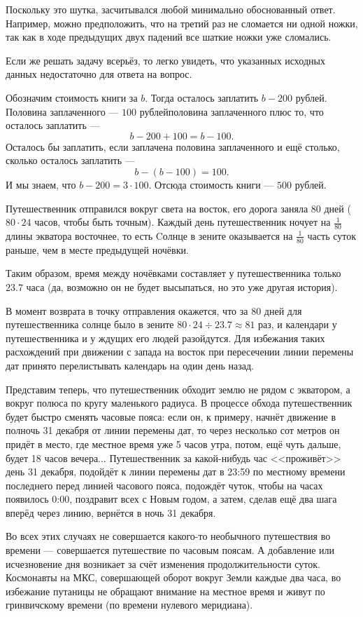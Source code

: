 \begin{itemize}

\itA Поскольку это шутка, засчитывался любой минимально обоснованный ответ. 
Например, можно предположить, что на третий раз не сломается ни одной ножки, 
так как в ходе предыдущих двух падений все шаткие ножки уже сломались. 

Если же решать задачу всерьёз, то легко увидеть, что указанных исходных данных
недостаточно для ответа на вопрос. 

\itB Обозначим стоимость книги за $b$. Тогда осталось заплатить $b - 200$ рублей.
Половина заплаченного --- $100$ рублей\scolon половина заплаченного плюс то, что
осталось заплатить ---
	$$b - 200 + 100 = b - 100.$$
Осталось бы заплатить, если заплачена половина 
заплаченного и ещё столько, сколько
осталось заплатить ---
	$$b - (b - 100) = 100.$$
И мы знаем, что $b - 200 = 3 \cdot 100$. Отсюда стоимость книги --- $500$ рублей.

\itC Путешественник отправился вокруг света на восток, его дорога 
заняла $80$ дней ($80 \cdot 24$ часов, чтобы быть точным). 
Каждый день путешественник ночует на $\frac{1}{80}$ длины 
экватора восточнее, то есть Cолнце в зените оказывается на $\frac{1}{80}$ часть
суток раньше, чем в месте предыдущей ночёвки.

Таким образом, время между 
ночёвками составляет у путешественника только $23.7$ часа (да, возможно он не будет 
высыпаться, но это уже другая история). 

В момент возврата в точку отправления окажется, что за $80$ дней для путешественника
солнце было в зените $80 \cdot 24 \div 23.7 \approx 81$ раз, и календари у путешественника
и у ждущих его людей разойдутся. Для избежания таких расхождений при движении с запада на восток
при пересечении линии перемены дат принято перелистывать календарь на один день назад.

Представим теперь, что путешественник обходит землю не рядом с экватором, 
а вокруг полюса по кругу маленького радиуса. В процессе обхода путешественник 
будет быстро сменять часовые пояса: если он, к примеру, начнёт движение в полночь 
31 декабря от линии перемены дат, то через несколько сот метров он придёт в место, 
где местное время уже 5 часов утра, потом, ещё чуть дальше, 
будет 18 часов вечера... Путешественник за какой-нибудь час <<проживёт>> день 31 декабря, 
подойдёт к линии перемены дат в 23:59 по местному времени последнего перед 
линией часового пояса, подождёт чуток, чтобы на часах появилось
0:00, поздравит всех с Новым годом, а затем, сделав ещё два шага вперёд 
через линию, вернётся в ночь 31 декабря. 

Во всех этих случаях не совершается какого-то необычного путешествия во 
времени --- совершается путешествие по часовым поясам. 
А добавление или исчезновение 
дня возникает за счёт изменения продолжительности суток. Космонавты на МКС,
совершающей оборот вокруг Земли каждые два часа, во избежание путаницы не
обращают внимание на местное время и живут по гринвичскому времени (по времени
нулевого меридиана).
\end{itemize}
